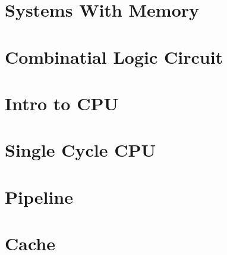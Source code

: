 \documentclass[en,11pt,english,black,simple,device=ppt]{elegantbook}
\begin{document}
\section{Systems With Memory}



\section{Combinatial Logic Circuit}





\section{Intro to CPU}




\section{Single Cycle CPU}



\section{Pipeline}





\section{Cache}


\end{document}
